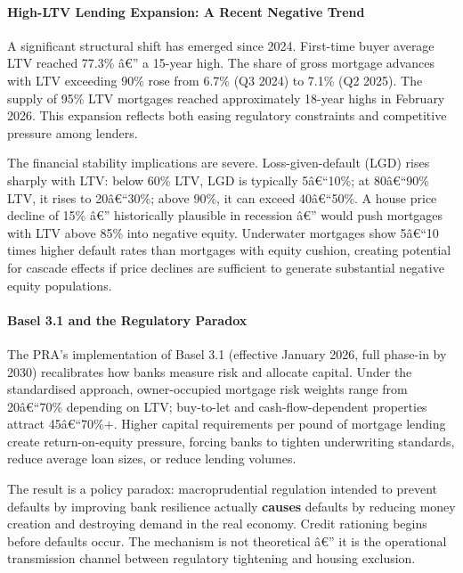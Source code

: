\paragraph{High-LTV Lending Expansion: A Recent Negative
Trend}\label{high-ltv-lending-expansion-a-recent-negative-trend}

A significant structural shift has emerged since 2024. First-time buyer
average LTV reached 77.3\% â€'' a 15-year high. The share of gross
mortgage advances with LTV exceeding 90\% rose from 6.7\% (Q3 2024) to
7.1\% (Q2 2025). The supply of 95\% LTV mortgages reached approximately
18-year highs in February 2026. This expansion reflects both easing
regulatory constraints and competitive pressure among lenders.

The financial stability implications are severe. Loss-given-default
(LGD) rises sharply with LTV: below 60\% LTV, LGD is typically
5â€``10\%; at 80â€``90\% LTV, it rises to 20â€``30\%; above 90\%, it can
exceed 40â€``50\%. A house price decline of 15\% â€'' historically
plausible in recession â€'' would push mortgages with LTV above 85\%
into negative equity. Underwater mortgages show 5â€``10 times higher
default rates than mortgages with equity cushion, creating potential for
cascade effects if price declines are sufficient to generate substantial
negative equity populations.

\paragraph{Basel 3.1 and the Regulatory
Paradox}\label{basel-3.1-and-the-regulatory-paradox}

The PRA's implementation of Basel 3.1 (effective January 2026, full
phase-in by 2030) recalibrates how banks measure risk and allocate
capital. Under the standardised approach, owner-occupied mortgage risk
weights range from 20â€``70\% depending on LTV; buy-to-let and
cash-flow-dependent properties attract 45â€``70\%+. Higher capital
requirements per pound of mortgage lending create return-on-equity
pressure, forcing banks to tighten underwriting standards, reduce
average loan sizes, or reduce lending volumes.

The result is a policy paradox: macroprudential regulation intended to
prevent defaults by improving bank resilience actually \textbf{causes}
defaults by reducing money creation and destroying demand in the real
economy. Credit rationing begins before defaults occur. The mechanism is
not theoretical â€'' it is the operational transmission channel between
regulatory tightening and housing exclusion.

